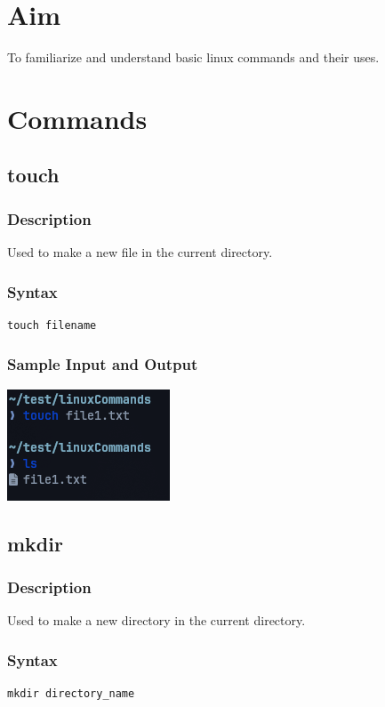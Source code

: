 
\section{Aim}
To familiarize and understand basic linux commands and their uses.

\section{Commands}

\subsection{touch}
\subsubsection{Description}
Used to make a new file in the current directory.

\subsubsection{Syntax}
\begin{verbatim}
touch filename
\end{verbatim}

\subsubsection{Sample Input and Output}
\includegraphics[]{Cycle_1//Outputs/touch_output.png}


\subsection{mkdir}
\subsubsection{Description}
Used to make a new directory in the current directory.

\subsubsection{Syntax}
\begin{verbatim}
mkdir directory_name
\end{verbatim}

